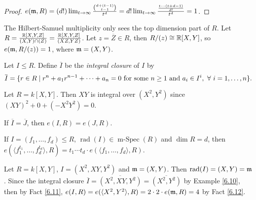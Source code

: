 \begin{proof}
    $e(\mathfrak{m},R) = (d!) \lim_{t \to \infty} \frac{\binom{d+(t-1)}{t-1}}{t^{d}} = d! \lim_{t \to \infty} \frac{\frac{t \cdots (t+d-1)}{d!}}{t^{d}} = 1$.
\end{proof}

\begin{fact}\label{6.8}
    The Hilbert-Samuel multiplicity only sees the top dimension part of $R$. Let $R = \frac{\mathbb{R}[X,Y,Z]}{(X,Y) \cap (Z)} = \frac{\mathbb{R}[X,Y,Z]}{(XZ,YZ)}$. Let $z = \overbar{Z} \in R$, then $R/(z) \cong \mathbb{R}[X,Y]$, so $e(\mathfrak{m},R/(z)) = 1$, where $\mathfrak{m} = (X,Y)$.
\end{fact}

\begin{definition}\label{6.9}
    Let $I \leq R$. Define $\overbar{I}$ be the \emph{integral closure} of $I$ by 
    \[\overbar{I} = \{r \in R \mid r^{n} + a_1r^{n-1} + \cdots + a_n = 0 \text{ for some $n \geq 1$ and $a_i \in I^{i}$}, \fa i = 1,\ldots,n\}.\]
\end{definition}

\begin{example}\label{6.10}
    Let $R = k[X,Y]$. Then $XY$ is integral over $(X^{2},Y^{2})$ since $(XY)^{2} + 0 + (-X^{2}Y^{2}) = 0$.
\end{example}

\begin{fact}\label{6.11}
    If $\overbar{I} = \overbar{J}$, then $e(I,R) = e(J,R)$.
\end{fact}

\begin{fact}\label{6.12}
    If $I = (f_1,\ldots,f_d) \leq R$, $\operatorname{rad}(I) \in \operatorname{m-Spec}(R)$ and $\dim R = d$, then $e(\langle f_1^{t_1},\ldots,f_d^{t_d} \rangle,R) = t_1 \cdots t_d \cdot e(\langle f_1,\ldots,f_d \rangle,R)$.
\end{fact}

\begin{example}\label{6.13}
    Let $R = k[X,Y]$, $I = (X^{2},XY,Y^{2})$ and $\mathfrak{m} = (X,Y)$. Then $\operatorname{rad}(I) = (X,Y) = \mathfrak{m}$. Since the integral closure $\overbar{I} = \overbar{(X^{2},XY,Y^{2})} = \overbar{(X^{2},Y^{2})}$ by Example \ref{6.10}, then by Fact \ref{6.11}, $e(I,R) = e(\langle X^{2},Y^{2} \rangle, R) = 2 \cdot 2 \cdot e(\mathfrak{m},R) = 4$ by Fact \ref{6.12}.
\end{example}


